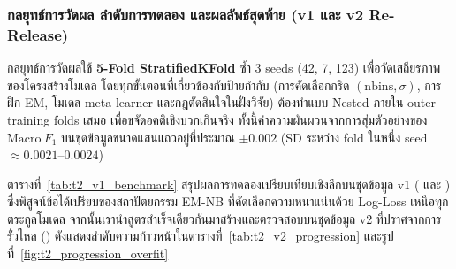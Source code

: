 \subsubsection{กลยุทธ์การวัดผล ลำดับการทดลอง และผลลัพธ์สุดท้าย (v1 และ v2 Re-Release)}
\label{subsubsec:t2_validation_results}

กลยุทธ์การวัดผลใช้ \textbf{5-Fold StratifiedKFold} ซ้ำ 3 seeds (42, 7, 123) เพื่อวัดเสถียรภาพของโครงสร้างโมเดล โดยทุกขั้นตอนที่เกี่ยวข้องกับป้ายกำกับ (การคัดเลือกกริด $(\mathrm{nbins}, \sigma)$, การฝึก EM, โมเดล meta-learner และกฎตัดสินใจในฝั่งวิจัย) ต้องทำแบบ Nested ภายใน outer training folds เสมอ เพื่อขจัดอคติเชิงบวกเกินจริง ทั้งนี้ค่าความผันผวนจากการสุ่มตัวอย่างของ $\mathrm{Macro}\ F_1$ บนชุดข้อมูลขนาดแสนแถวอยู่ที่ประมาณ $\pm 0.002$ (SD ระหว่าง fold ในหนึ่ง seed $\approx 0.0021\text{--}0.0024$)

ตารางที่~\ref{tab:t2_v1_benchmark} สรุปผลการทดลองเปรียบเทียบเชิงลึกบนชุดข้อมูล v1 ( และ ) ซึ่งพิสูจน์ข้อได้เปรียบของสถาปัตยกรรม EM-NB ที่คัดเลือกความหนาแน่นด้วย Log-Loss เหนือทุกตระกูลโมเดล จากนั้นเรานำสูตรสำเร็จเดียวกันมาสร้างและตรวจสอบบนชุดข้อมูล v2 ที่ปราศจากการรั่วไหล () ดังแสดงลำดับความก้าวหน้าในตารางที่~\ref{tab:t2_v2_progression} และรูปที่~\ref{fig:t2_progression_overfit}

